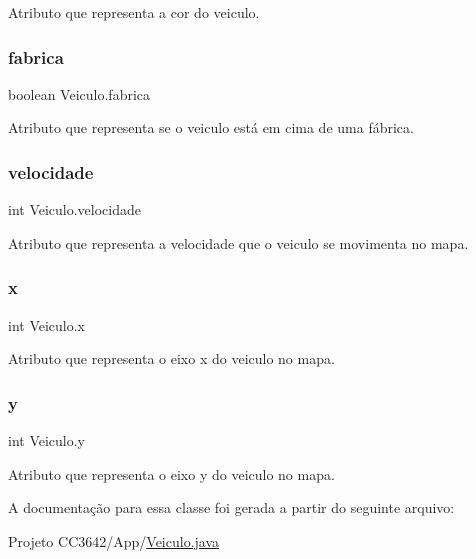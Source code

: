 Atributo que representa a cor do veiculo. 

\mbox{\label{class_veiculo_a23d377a69bdf558ebedb5bc35dcdebf5}} 
\subsubsection{\texorpdfstring{fabrica}{fabrica}}
{\footnotesize\ttfamily boolean Veiculo.\+fabrica\hspace{0.3cm}{\ttfamily [protected]}}



Atributo que representa se o veiculo está em cima de uma fábrica. 

\mbox{\label{class_veiculo_a2edf5e3132b1c2504c441dc095dc7e0e}} 
\subsubsection{\texorpdfstring{velocidade}{velocidade}}
{\footnotesize\ttfamily int Veiculo.\+velocidade\hspace{0.3cm}{\ttfamily [protected]}}



Atributo que representa a velocidade que o veiculo se movimenta no mapa. 

\mbox{\label{class_veiculo_a069917a284297fe5b385258b2afd9ad6}} 
\subsubsection{\texorpdfstring{x}{x}}
{\footnotesize\ttfamily int Veiculo.\+x\hspace{0.3cm}{\ttfamily [private]}}



Atributo que representa o eixo x do veiculo no mapa. 

\mbox{\label{class_veiculo_af25046404db7c2786c0d9e468bb1fb64}} 
\subsubsection{\texorpdfstring{y}{y}}
{\footnotesize\ttfamily int Veiculo.\+y\hspace{0.3cm}{\ttfamily [private]}}



Atributo que representa o eixo y do veiculo no mapa. 



A documentação para essa classe foi gerada a partir do seguinte arquivo\+:\begin{DoxyCompactItemize}
\item 
Projeto C\+C3642/\+App/\mbox{\hyperlink{_veiculo_8java}{Veiculo.\+java}}\end{DoxyCompactItemize}
